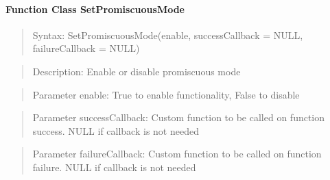 \paragraph{Function Class SetPromiscuousMode}
\begin{quote}Syntax: SetPromiscuousMode(enable, successCallback = NULL, failureCallback = NULL)\end{quote}
\begin{quote}Description: Enable or disable promiscuous mode\end{quote}
\begin{quote}Parameter enable: True to enable functionality, False to disable\end{quote}
\begin{quote}Parameter successCallback: Custom function to be called on function success. NULL if callback is not needed\end{quote}
\begin{quote}Parameter failureCallback: Custom function to be called on function failure. NULL if callback is not needed\end{quote}

